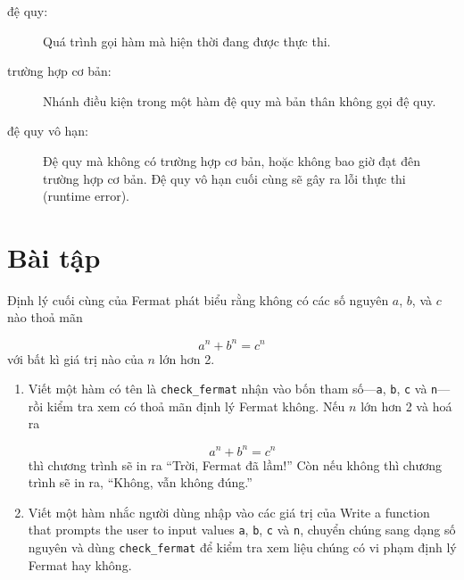 \documentclass[11pt]{book}
\begin{document}
\begin{description}
\item[đệ quy:]  Quá trình gọi hàm mà hiện thời đang được thực thi.

\item[trường hợp cơ bản:]  Nhánh điều kiện trong một hàm đệ quy mà bản thân không
gọi đệ quy.

\item[đệ quy vô hạn:]  Đệ quy mà không có trường hợp cơ bản, hoặc không bao giờ đạt
đên trường hợp cơ bản. Đệ quy vô hạn cuối cùng sẽ gây ra lỗi thực thi (runtime error).

\end{description}

\section{Bài tập}

\begin{ex}

Định lý cuối cùng của Fermat phát biểu rằng không có các số nguyên
$a$, $b$, và $c$ nào thoả mãn

\[ a^n + b^n = c^n \]
%
với bất kì giá trị nào của $n$ lớn hơn 2.

\begin{enumerate}

\item Viết một hàm có tên là \verb"check_fermat" nhận vào bốn
tham số---{\tt a}, {\tt b}, {\tt c} và {\tt n}---rồi kiểm tra xem 
có thoả mãn định lý Fermat không.  Nếu 
$n$ lớn hơn 2 và hoá ra 

\[a^n + b^n = c^n \]
%
thì chương trình sẽ in ra ``Trời, Fermat đã lầm!''
Còn nếu không thì chương trình sẽ in ra, ``Không, vẫn không đúng.''

\item Viết một hàm nhắc người dùng nhập vào các giá trị của 
Write a function that prompts the user to input values
{\tt a}, {\tt b}, {\tt c} và {\tt n}, chuyển chúng sang dạng số nguyên
và dùng \verb"check_fermat" để kiểm tra xem liệu chúng có vi phạm
định lý Fermat hay không.

\end{enumerate}

\end{ex}
\end{document}
